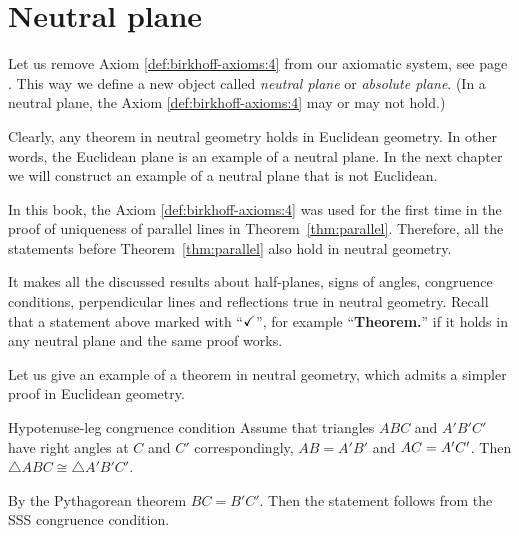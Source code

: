 \chapter{Neutral plane}\label{chap:non-euclid}

Let us remove Axiom \ref{def:birkhoff-axioms:4} from our axiomatic system, see page \pageref{def:birkhoff-axioms:0}.
This way we define a new object called 
\emph{neutral plane} or \emph{absolute plane}.
(In a neutral plane, the Axiom \ref{def:birkhoff-axioms:4} may or may not hold.)

Clearly, any theorem in neutral geometry holds in Euclidean geometry.
In other words, the Euclidean plane is an example of a neutral plane. 
In the next chapter we will construct an example of a neutral plane that is not Euclidean.

In this book, 
the Axiom \ref{def:birkhoff-axioms:4} was used
for the first time in the proof of uniqueness of parallel lines in Theorem~\ref{thm:parallel}.
Therefore, all the statements before Theorem~\ref{thm:parallel} also hold in neutral geometry.

It makes all the discussed results
about
half-planes,
signs of angles,
congruence conditions,
perpendicular lines and reflections 
true in neutral geometry.
Recall that a statement above marked with ``$\checkmark$'',\label{a-mark} for example ``\textbf{Theorem.\abs}'' if it holds in any neutral plane and the same proof works.


Let us give an example of a theorem in neutral geometry,
which admits a simpler proof in Euclidean geometry. 

\begin{thm}{Hypotenuse-leg congruence condition}
Assume that triangles $ABC$ and $A'B'C'$
have right angles at $C$ and $C'$ correspondingly, 
$AB=A'B'$ and $AC\z=A'C'$.
Then $\triangle ABC\cong\triangle A'B'C'$.
\end{thm}


By the Pythagorean theorem $BC=B'C'$.
Then the statement follows from the SSS congruence condition.
\qeds


